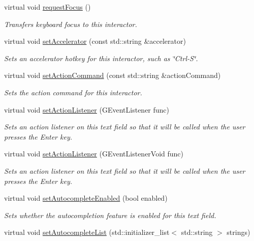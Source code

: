 \begin{DoxyCompactItemize}
virtual void \mbox{\hyperlink{classGInteractor_a519fb2ac767f8b2febbb50b898b8c8cb}{request\+Focus}} ()
\begin{DoxyCompactList}\small\item\em Transfers keyboard focus to this interactor. \end{DoxyCompactList}\item 
virtual void \mbox{\hyperlink{classGInteractor_ad15f102f62e2960576012f1aa0ba4b2e}{set\+Accelerator}} (const std\+::string \&accelerator)
\begin{DoxyCompactList}\small\item\em Sets an accelerator hotkey for this interactor, such as \char`\"{}\+Ctrl-\/\+S\char`\"{}. \end{DoxyCompactList}\item 
virtual void \mbox{\hyperlink{classGInteractor_a4b5843fe3030e038a1ba54cc03389bcf}{set\+Action\+Command}} (const std\+::string \&action\+Command)
\begin{DoxyCompactList}\small\item\em Sets the action command for this interactor. \end{DoxyCompactList}\item 
virtual void \mbox{\hyperlink{classGTextField_adcfb4742430c88714fcf57e57ab8ea9c}{set\+Action\+Listener}} (G\+Event\+Listener func)
\begin{DoxyCompactList}\small\item\em Sets an action listener on this text field so that it will be called when the user presses the Enter key. \end{DoxyCompactList}\item 
virtual void \mbox{\hyperlink{classGTextField_aebd20a89c7a8a43a6fce999cf4f9fcf2}{set\+Action\+Listener}} (G\+Event\+Listener\+Void func)
\begin{DoxyCompactList}\small\item\em Sets an action listener on this text field so that it will be called when the user presses the Enter key. \end{DoxyCompactList}\item 
virtual void \mbox{\hyperlink{classGTextField_a173f724f6099be5a2ed423baf3433b83}{set\+Autocomplete\+Enabled}} (bool enabled)
\begin{DoxyCompactList}\small\item\em Sets whether the autocompletion feature is enabled for this text field. \end{DoxyCompactList}\item 
virtual void \mbox{\hyperlink{classGTextField_ab0245df51aa762af89f0d2cf31ce6ddd}{set\+Autocomplete\+List}} (std\+::initializer\+\_\+list$<$ std\+::string $>$ strings)

\end{DoxyCompactItemize}
